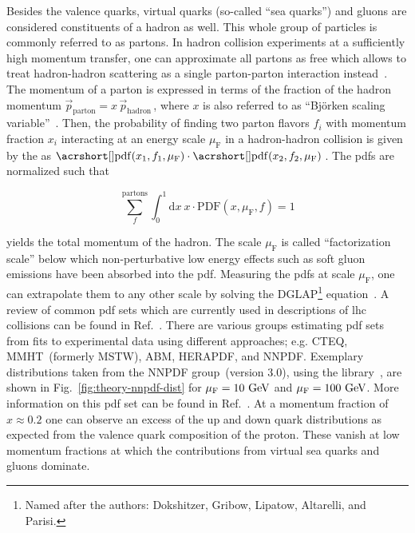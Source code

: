 Besides the valence quarks, virtual quarks (so-called ``sea quarks'') and gluons are considered constituents of a hadron as well. This whole group of particles is commonly referred to as partons. In hadron collision experiments at a sufficiently high momentum transfer, one can approximate all partons as free which allows to treat hadron-hadron scattering as a single parton-parton interaction instead~\cite{Feynman:1969wa}. The momentum of a parton is expressed in terms of the fraction of the hadron momentum $\vec{p}_\mathrm{parton}=x\, \vec{p}_\mathrm{hadron}\,$, where $x$ is also referred to as ``Bj\"orken scaling variable''~\cite{Bjorken:1967fb}. Then, the probability of 
finding two parton flavors $f_{i}$ with momentum fraction $x_{i}$ interacting at an energy scale $\mu_\mathrm{F}$ in a hadron-hadron collision is given by the  as $\mathrm{\gls{pdf}}(x_{1},f_{1},\mu_\mathrm{F})\cdot\mathrm{\gls{pdf}}(x_{2},f_{2},\mu_\mathrm{F})\,$. The \glspl{pdf} are normalized such that

\begin{equation}
\sum_{f}^\mathrm{partons}\int_{0}^{1}\mathrm{d}x~x\cdot \mathrm{PDF}(x,\mu_\mathrm{F},f)=1
\end{equation}

yields the total momentum of the hadron. The scale $\mu_\mathrm{F}$ is called ``factorization scale'' below which non-perturbative low energy effects such as soft gluon emissions have been absorbed into the \gls{pdf}. Measuring the \glspl{pdf} at scale $\mu_\mathrm{F}$, one can extrapolate them to any other scale by solving the DGLAP\footnote{Named after the authors: Dokshitzer, Gribow, Lipatow, Altarelli, and Parisi.} equation~\cite{Dokshitzer:1977sg,Gribov:1972ri,Altarelli:1977zs}. A review of common \gls{pdf} sets which are currently used in descriptions of \gls{lhc} collisions can be found in Ref.~\cite{Accardi2016}. There are various groups estimating \gls{pdf} sets from fits to experimental data using different approaches; e.g. CTEQ, MMHT~(formerly MSTW), ABM, HERAPDF, and NNPDF. Exemplary distributions taken from the NNPDF group~(version 3.0), using the \LHAPDF[format=hyperbf] library~\cite{Buckley:2014ana}, are shown in Fig.~\ref{fig:theory-nnpdf-dist} for $\mu_\mathrm{F}=10~\textrm{GeV}$ and $\mu_\mathrm{F}=100~\textrm{GeV}$. More information on this \gls{pdf} set can be found in Ref.~\cite{Ball:2014uwa}. At a momentum fraction of $x\approx0.2$ one can observe an excess of the up and down quark distributions as expected from the valence quark composition of the proton. These vanish at low momentum fractions at which the contributions from virtual sea quarks and gluons dominate.

